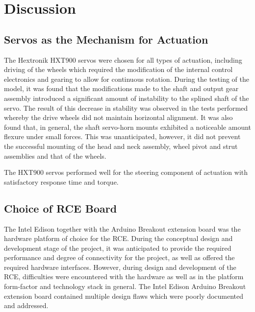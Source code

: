 \section{Discussion}
  \subsection{Servos as the Mechanism for Actuation}
    \label{subsec:rec-servoSuitability}
    The Hextronik HXT900 servos were chosen for all types of actuation, including driving of the wheels which required the modification of the internal control electronics and gearing to allow for continuous rotation. During the testing of the model, it was found that the modifications made to the shaft and output gear assembly introduced a significant amount of instability to the splined shaft of the servo. The result of this decrease in stability was observed in the tests performed whereby the drive wheels did not maintain horizontal alignment. It was also found that, in general, the shaft servo-horn mounts exhibited a noticeable amount flexure under small forces. This was unanticipated, however, it did not prevent the successful mounting of the head and neck assembly, wheel pivot and strut assemblies and that of the wheels.
    
    The HXT900 servos performed well for the steering component of actuation with satisfactory response time and torque.
  
  \subsection{Choice of RCE Board}
    \label{subsec:rec-choiceOfRCEBoard}
    The Intel Edison together with the Arduino Breakout extension board was the hardware platform of choice for the RCE. During the conceptual design and development stage of the project, it was anticipated to provide the required performance and degree of connectivity for the project, as well as offered the required hardware interfaces. However, during design and development of the RCE, difficulties were encountered with the hardware as well as in the platform form-factor and technology stack in general. The Intel Edison Arduino Breakout extension board contained multiple design flaws which were poorly documented and addressed.
    
